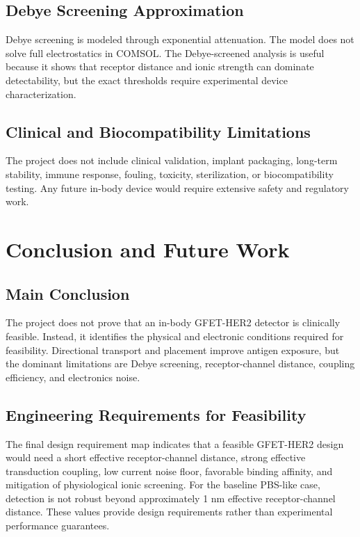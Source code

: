 ﻿\documentclass[12pt,a4paper,oneside]{report}
\begin{document}
\section{Debye Screening Approximation}
Debye screening is modeled through exponential attenuation. The model does not solve full electrostatics in COMSOL. The Debye-screened analysis is useful because it shows that receptor distance and ionic strength can dominate detectability, but the exact thresholds require experimental device characterization.

\section{Clinical and Biocompatibility Limitations}
The project does not include clinical validation, implant packaging, long-term stability, immune response, fouling, toxicity, sterilization, or biocompatibility testing. Any future in-body device would require extensive safety and regulatory work.

\chapter{Conclusion and Future Work}

\section{Main Conclusion}
The project does not prove that an in-body GFET-HER2 detector is clinically feasible. Instead, it identifies the physical and electronic conditions required for feasibility. Directional transport and placement improve antigen exposure, but the dominant limitations are Debye screening, receptor-channel distance, coupling efficiency, and electronics noise.

\section{Engineering Requirements for Feasibility}
The final design requirement map indicates that a feasible GFET-HER2 design would need a short effective receptor-channel distance, strong effective transduction coupling, low current noise floor, favorable binding affinity, and mitigation of physiological ionic screening. For the baseline PBS-like case, detection is not robust beyond approximately 1 nm effective receptor-channel distance. These values provide design requirements rather than experimental performance guarantees.
\end{document}

